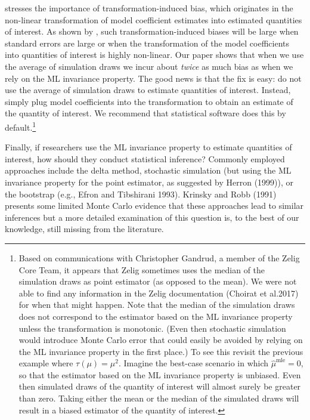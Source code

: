 \documentclass[11pt]{article}
\begin{document}
\cite{Rainey2017} stresses the importance of transformation-induced bias, which originates in the non-linear transformation of model coefficient estimates into estimated quantities of interest. As shown by \cite{Rainey2017}, such transformation-induced biases will be large when standard errors are large or when the transformation of the model coefficients into quantities of interest is highly non-linear. Our paper shows that when we use the average of simulation draws we incur about \textit{twice} as much bias as when we rely on the ML invariance property. The good news is that the fix is easy: do not use the average of simulation draws to estimate quantities of interest. Instead, simply plug model coefficients into the transformation to obtain an estimate of the quantity of interest. We recommend that statistical software does this by default.\footnote{Based on communications with Christopher Gandrud, a member of the Zelig Core Team, it appears that Zelig sometimes uses the median of the simulation draws as point estimator (as opposed to the mean). We were not able to find any information in the Zelig documentation (Choirat et al.\@ 2017) for when that might happen. Note that the median of the simulation draws does not correspond to the estimator based on the ML invariance property unless the transformation is monotonic. (Even then stochastic simulation would introduce Monte Carlo error that could easily be avoided by relying on the ML invariance property in the first place.) To see this revisit the previous example where $\tau(\mu) = \mu^2.$ Imagine the best-case scenario in which $\hat{\mu}^\text{mle} = 0$, so that the estimator based on the ML invariance property is unbiased. Even then simulated draws of the quantity of interest will almost surely be greater than zero. Taking either the mean or the median of the simulated draws will result in a biased estimator of the quantity of interest.}


Finally, if researchers use the ML invariance property to estimate quantities of interest, how should they conduct statistical inference? Commonly employed approaches include the delta method, stochastic simulation (but using the ML invariance property for the point estimator, as suggested by Herron (1999)), or the bootstrap (e.g., Efron and Tibshirani 1993). Krinsky and Robb (1991) presents some limited Monte Carlo evidence that these approaches lead to similar inferences but a more detailed examination of this question is, to the best of our knowledge, still missing from the literature.

\singlespace
\small


\end{document}
